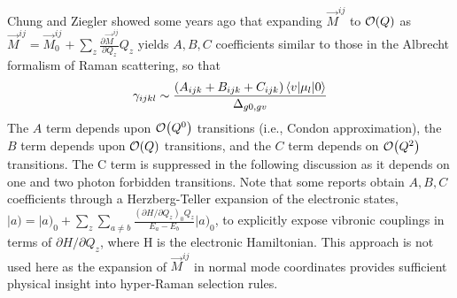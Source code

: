\documentclass[aip, jcp, reprint, onecolumn]{revtex4-2}
\begin{document}
Chung and Ziegler showed some years ago that expanding $\vec{M}^{ij}$ to $\order{Q}$ as
$\vec{M}^{ij} = \vec{M}^{ij}_0 + \sum_z \frac{\partial\vec{M}^{ij}}{\partial Q_z} Q_z$
yields $A, B, C$ coefficients similar to those in the Albrecht formalism of Raman scattering, \cite{Albrecht1961, Ziegler1988} so that
\begin{equation}
		\gamma_{ijkl} \sim \frac{(A_{ijk} + B_{ijk} + C_{ijk})\mel{v}{\mu_{l}}{0}} {\Delta_{g0,gv}}
\end{equation}
The $A$ term depends upon $\order{Q^0}$ transitions (i.e., Condon approximation), the $B$ term depends upon $\order{Q}$ transitions, and the $C$ term depends on $\order{Q^2}$ transitions. 
The C term is suppressed in the following discussion as it depends on one and two photon forbidden transitions. \cite{Ziegler1988, Neddersen1989, Bonang1992}
Note that some reports obtain $A, B, C$ coefficients through a Herzberg-Teller expansion of the electronic states, $|a) = |a)_0 + \sum_z \sum_{a \neq b} \frac{(\partial H / \partial Q_z )_0  Q_z}{E_a - E_b} |a)_0$, to explicitly expose vibronic couplings in terms of $\partial H / \partial Q_z $, where H is the electronic Hamiltonian.\cite{HerzbergTeller1933, Petrov1985, Neddersen1989, Baranov1990}
This approach is not used here as the expansion of $\vec{M}^{ij}$ in normal mode coordinates provides sufficient physical insight into hyper-Raman selection rules. 
\end{document}

